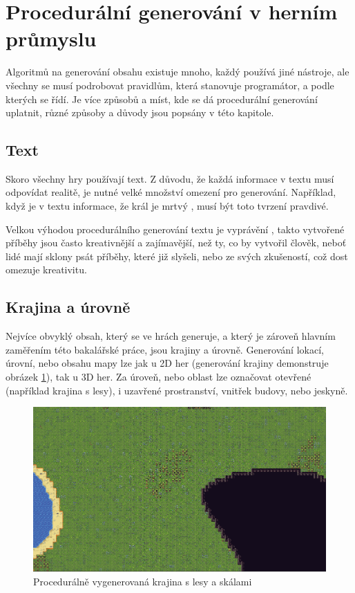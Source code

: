 \section{Procedurální generování v herním průmyslu}
\label{proceduralInGames}
Algoritmů na generování obsahu existuje mnoho, každý používá jiné nástroje, ale všechny se musí podrobovat pravidlům, která stanovuje programátor, a podle kterých se řídí. Je více způsobů a míst, kde se dá procedurální generování uplatnit, různé způsoby a důvody jsou popsány v této kapitole.

\subsection{Text}
Skoro všechny hry používají text. Z důvodu, že každá informace v textu musí odpovídat realitě, je nutné velké množství omezení pro generování. Například, když je v textu informace, že král je mrtvý \cite{liuDeep}, musí být toto tvrzení pravdivé.

Velkou výhodou procedurálního generování textu je vyprávění \cite{madoc59000}, takto vytvořené příběhy jsou často kreativnější a zajímavější, než ty, co by vytvořil člověk, neboť lidé mají sklony psát příběhy, které již slyšeli, nebo ze svých zkušeností, což dost omezuje kreativitu.

\subsection{Krajina a úrovně}
Nejvíce obvyklý obsah, který se ve hrách generuje, a který je zároveň hlavním zaměřením této bakalářské práce, jsou krajiny a úrovně. Generování lokací, úrovní, nebo obsahu mapy lze jak u 2D her (generování krajiny demonstruje obrázek \ref{proceduralWorld}), tak u 3D her. Za úroveň, nebo oblast lze označovat otevřené (například krajina s lesy), i uzavřené prostranství, vnitřek budovy, nebo jeskyně.

\begin{figure}[h]
	\centering
	\includegraphics[scale=0.6]{obrazky-figures/ProceduralWorld.png}
	\caption{Procedurálně vygenerovaná krajina s lesy a skálami}
	\label{proceduralWorld}
\end{figure}

